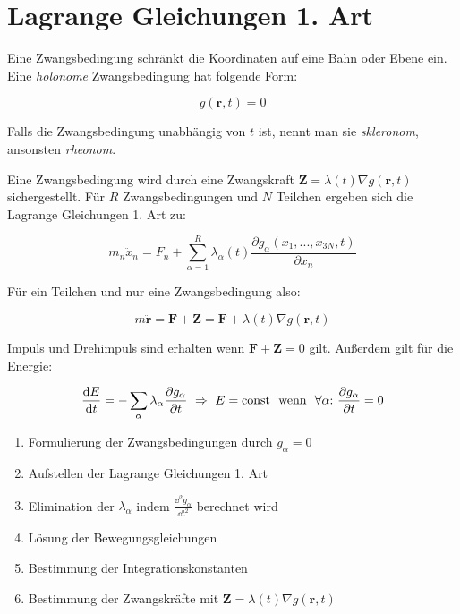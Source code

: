 \section{Lagrange Gleichungen 1. Art}

\begin{frameddefn}[Zwangsbedingungen]

Eine Zwangsbedingung schränkt die Koordinaten auf eine Bahn oder Ebene ein. Eine \textit{holonome} Zwangsbedingung hat folgende Form:

\[ g(\mathbf{r}, t) = 0 \]

Falls die Zwangsbedingung unabhängig von $t$ ist, nennt man sie \textit{skleronom}, ansonsten \textit{rheonom}.
	
\end{frameddefn}

\begin{frameddefn}
	
	Eine Zwangsbedingung wird durch eine Zwangskraft $\mathbf{Z} = \lambda(t) \nabla g(\mathbf{r}, t)$ sichergestellt. Für $R$ Zwangsbedingungen und $N$ Teilchen ergeben sich die Lagrange Gleichungen 1. Art zu:
	
	\[ m_n \ddot x_n = F_n + \sum^R_{\alpha=1} \lambda_\alpha(t) \frac{\partial g_\alpha(x_1,...,x_{3N}, t)}{\partial x_n}  \]
	
	Für ein Teilchen und nur eine Zwangsbedingung also:
	
	\[ m \mathbf{\ddot r} = \mathbf{F} + \mathbf{Z} = \mathbf{F} + \lambda(t) \nabla g(\mathbf{r}, t) \]
	
	Impuls und Drehimpuls sind erhalten wenn $\mathbf{F} + \mathbf{Z} = 0$ gilt. Außerdem gilt für die Energie:
	
	\[ \frac{\mathrm{d} E}{\mathrm{d} t} = - \sum_\alpha \lambda_\alpha \frac{\partial g_\alpha}{\partial t} \ \Rightarrow \ E = \textrm{const} \ \textrm{ wenn } \ \forall \alpha {:}\  \frac{\partial g_\alpha}{\partial t} = 0 \]
	
\end{frameddefn}

\begin{framedmeth}
	
	\begin{enumerate}
		\item Formulierung der Zwangsbedingungen durch $g_\alpha = 0$
		\item Aufstellen der Lagrange Gleichungen 1. Art
		\item Elimination der $\lambda_\alpha$ indem $\frac{\dd^2 g_\alpha}{\dd t^2}$ berechnet wird
		\item Lösung der Bewegungsgleichungen
		\item Bestimmung der Integrationskonstanten
		\item Bestimmung der Zwangskräfte mit $\mathbf{Z} = \lambda(t) \nabla g(\mathbf{r}, t)$
	\end{enumerate}
	
\end{framedmeth}


